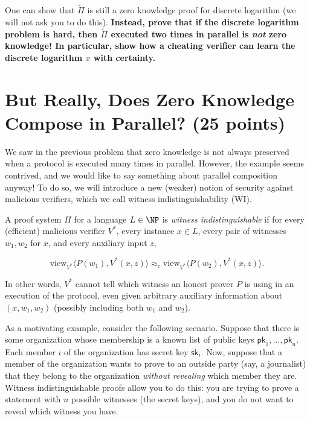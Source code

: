 \documentclass{article}
\newcommand{\pk}{\mathsf{pk}}
\newcommand{\sk}{\mathsf{sk}}
\begin{document}
One can show that $\tilde \Pi$ is still a zero knowledge proof for discrete logarithm (we will not ask you to do this). \textbf{Instead, prove that if the discrete logarithm problem is hard, then $\tilde \Pi$ executed two times in parallel is \emph{not} zero knowledge! In particular, show how a cheating verifier can learn the discrete logarithm $x$ with certainty.}
\newpage

\section{But Really, Does Zero Knowledge Compose in Parallel? (25 points)}
We saw in the previous problem that zero knowledge is not always preserved when a protocol is executed many times in parallel. However, the example seems contrived, and we would like to say something about parallel composition anyway! To do so, we will introduce a new (weaker) notion of security against malicious verifiers, which we call witness indistinguishability (WI).

\begin{definition}
	A proof system $\Pi$ for a language $L\in \NP$ is \emph{witness indistinguishable} if for every (efficient) malicious verifier $V^*$, every instance $x\in L$, every pair of witnesses $w_1, w_2$ for $x$, and every auxiliary input $z$,
	
	\[ \mathrm{view}_{V^*}\langle P(w_1), V^*(x, z) \rangle \approx_c \mathrm{view}_{V^*}\langle P(w_2), V^*(x, z) \rangle.
	\]
	
	In other words, $V^*$ cannot tell which witness an honest prover $P$ is using in an execution of the protocol, even given arbitrary auxiliary information about $(x, w_1, w_2)$ (possibly including both $w_1$ and $w_2$).
\end{definition}

As a motivating example, consider the following scenario. Suppose that there is some organization whose membership is a known list of public keys $\pk_1, \hdots, \pk_n$. Each member $i$ of the organization has secret key $\sk_i$. Now, suppose that a member of the organization wants to prove to an outside party (say, a journalist) that they belong to the organization \emph{without revealing} which member they are. Witness indistinguishable proofs allow you to do this: you are trying to prove a statement with $n$ possible witnesses (the secret keys), and you do not want to reveal which witness you have.
\end{document}
